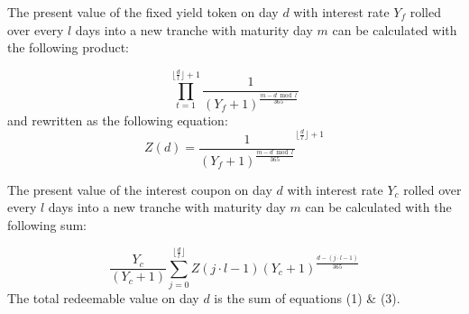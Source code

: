 \documentclass[10pt,oneside,reqno]{minimal}
\begin{document}
\begin{flushleft}
The present value of the fixed yield token on day $d$ with interest rate $Y_{f}$ rolled over every $l$ days into a new tranche with maturity day $m$ can be calculated with the following product:
\end{flushleft}
  \bigskip
  \begin{equation}
\prod_{t=1}^{\lfloor{\frac{d}{l}}\rfloor+1}\frac{1}{(Y_{f}+1)^{\frac{m-d\bmod l}{365}}}
  \end{equation}
  \bigskip
and rewritten as the following equation:
  \begin{equation}
  Z\left(d\right)=\frac{1}{\left(Y_{f}+1\right)^{\frac{m- d\bmod l}{365}}}^{\lfloor{\frac{d}{l}}\rfloor+1}
  \end{equation}
  \bigskip
\begin{flushleft}
The present value of the interest coupon on day $d$ with interest rate $Y_{c}$ rolled over every $l$ days into a new tranche with maturity day $m$ can be calculated with the following sum:
\end{flushleft}
  \bigskip
  \begin{equation}
\frac{Y_{c}}{\left(Y_{c}+1\right)}\sum_{j=0}^{\lfloor{\frac{d}{l}}\rfloor}Z\left(j\cdot l-1\right)(Y_{c}+1)^{\frac{d-\left(j\cdot l-1\right)}{365}}
  \end{equation}
  \bigskip
The total redeemable value on day $d$ is the sum of equations (1) \& (3).
\end{document}
